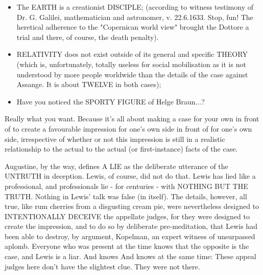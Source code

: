 \begin{multicols}{2}
\begin{itemize}
	\item The EARTH is a creationist DISCIPLE; (according to witness testimony of Dr. G. Galilei, mathematician and astronomer, v. 22.6.1633. Stop, fun! The heretical adherence to the "Copernican world view" brought the Dottore a trial and there, of course, the death penalty).
	\item RELATIVITY does not exist outside of its general and specific THEORY (which is, unfortunately, totally useless for social mobilisation as it is not understood by more people worldwide than the details of the case against Assange. It is about TWELVE in both cases);
	\item Have you noticed the SPORTY FIGURE of Helge Braun...?
\end{itemize}

Really what you want. Because it's all about making a case for your own in front of
to create a favourable impression for one's own side in front of
for one's own side, irrespective of whether or not this
impression is still in a realistic relationship to the actual
to the actual (or first-instance) facts of the case.


Augustine, by the way, defines A LIE as the deliberate utterance of the UNTRUTH in deception. Lewis, of course, did not do that. Lewis has
lied like a professional, and professionals lie - for centuries - with NOTHING BUT THE TRUTH.
Nothing in Lewis' talk was false (in itself).
The details, however, all true, like rum cherries from a
disgusting cream pie, were nevertheless designed to INTENTIONALLY DECEIVE the appellate judges, for they were designed to create the impression, and to do so by deliberate pre-meditation,
that Lewis had been able to destroy, by argument, Kopelman, an expert witness of unsurpassed aplomb. Everyone who was present at the time knows that the
opposite is the case, and Lewis is a liar. And knows
And knows at the same time: These appeal judges here don't have
the slightest clue. They were not there.


\end{multicols}
